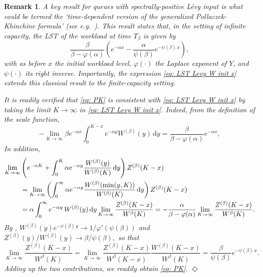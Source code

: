 \documentclass[reqno,12pt]{amsart}
\newtheorem{remark}{Remark}
\begin{document}
\begin{remark}
    {\em A key result for queues with spectrally-positive L\'evy input is what could be termed the `time-dependent version of the generalized Pollaczek-Khinchine formula' (see e.g.\ \cite[Theorem 4.1]{DM}). This result states that, in the setting of {\it infinite} capacity, the LST of the workload at time $T_\beta$ is given by
     \begin{equation}\label{eq: PK}\frac{\beta}{\beta-\varphi(\alpha)}\left(e^{-\alpha x} -\frac{\alpha}{\psi(\beta)}e^{-\psi(\beta) \,x}\right),\end{equation}
     with as before $x$ the initial workload level, $\varphi(\cdot)$ the Laplace exponent of $Y$, and $\psi(\cdot)$ its right inverse. Importantly, the expression \eqref{eq: LST Levy W init x} extends this classical result to the finite-capacity setting.
     
    It is readily verified that \eqref{eq: PK} is consistent with \eqref{eq: LST Levy W init x} by taking the limit $K\to\infty$ in \eqref{eq: LST Levy W init x}. Indeed, from the definition of the scale function,
    \[
    -\lim_{K\to\infty}  \beta e^{-\alpha x}\int_0^{K-x}e^{-\alpha y}W^{(\beta)}(y)\,\mathrm{d}y = \frac{\beta}{\beta-\varphi(\alpha)}e^{-\alpha x},
    \] 
    In addition,
    \begin{align*}
        \lim_{K\to\infty}  &\left(e^{-\alpha K} + \int_0^K \alpha e^{-\alpha y}\frac{W^{(\beta)}(y)}{W^{(\beta)}(K)}\,\mathrm{d}y\right)Z^{(\beta)}(K-x) \\&=\lim_{K\to\infty}  \left(
        \int_0^\infty \alpha e^{-\alpha y}\frac{W^{(\beta)}(\min(y,K))}{W^{(\beta)}(K)}\,\mathrm{d}y
        \right)Z^{(\beta)}(K-x)\\
        &=\alpha \int_0^\infty e^{-\alpha y}\,W^{(\beta)}(y)\,{\rm d}y \lim_{K\to\infty}\frac{Z^{(\beta)}(K-x) }{W^\beta(K)}=-\frac{\alpha}{\beta-\varphi(\alpha)}\lim_{K\to\infty}\frac{Z^{(\beta)}(K-x) }{W^\beta(K)}.
    \end{align*}
    By \cite[Lemma 3.3]{KUZ}, $W^{(\beta)}(y)e^{-\psi(\beta)\,y}\to 1/\varphi'(\psi(\beta))$ and $Z^{(\beta)}(y)/W^{(\beta)}(y)\to \beta/\psi(\beta),$
    so that
    \[\lim_{K\to\infty}\frac{Z^{(\beta)}(K-x) }{W^\beta(K)} =\lim_{K\to\infty}\frac{Z^{(\beta)}(K-x) }{W^\beta(K-x)}\frac{W^{(\beta)}(K-x) }{W^\beta(K)} = \frac{\beta}{\psi(\beta)} e^{-\psi(\beta)\,x}.\]
    Adding up the two contributions, we readily obtain \eqref{eq: PK}. \hfill$\Diamond$
    }
\end{remark}
\end{document}
